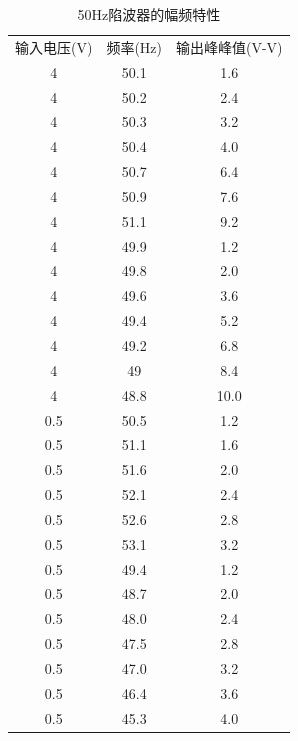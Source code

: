\documentclass{article}
\begin{document}
\begin{table}[htbp]
    \centering
    \caption{50Hz陷波器的幅频特性}
    \label{tab:example}

    \begin{tabular}{ccc}
    \hline 
    输入电压(V) & 频率(Hz) & 输出峰峰值(V-V) \\ 
    4 & 50.1 & 1.6 \\ 
    4 & 50.2 & 2.4 \\ 
    4 & 50.3 & 3.2 \\ 
    4 & 50.4 & 4.0 \\ 
    4 & 50.7 & 6.4 \\ 
    4 & 50.9 & 7.6 \\ 
    4 & 51.1 & 9.2 \\ 
    4 & 49.9 & 1.2 \\ 
    4 & 49.8 & 2.0 \\ 
    4 & 49.6 & 3.6 \\ 
    4 & 49.4 & 5.2 \\ 
    4 & 49.2 & 6.8 \\ 
    4 & 49 & 8.4 \\ 
    4 & 48.8 & 10.0 \\ 

    0.5 & 50.5 & 1.2 \\ 
    0.5 & 51.1 & 1.6 \\ 
    0.5 & 51.6 & 2.0 \\ 
    0.5 & 52.1 & 2.4 \\ 
    0.5 & 52.6 & 2.8 \\ 
    0.5 & 53.1 & 3.2 \\ 
    0.5 & 49.4 & 1.2 \\ 
    0.5 & 48.7 & 2.0 \\ 
    0.5 & 48.0 & 2.4 \\ 
    0.5 & 47.5 & 2.8 \\ 
    0.5 & 47.0 & 3.2 \\ 
    0.5 & 46.4 & 3.6 \\ 
    0.5 & 45.3 & 4.0 \\ 

\end{tabular}
    
\end{table}
\clearpage
\end{document}
